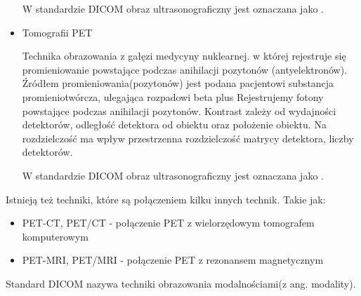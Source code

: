 \begin{itemize}
    W standardzie DICOM obraz ultrasonograficzny jest oznaczana jako .

    \item Tomografii PET
    
    Technika obrazowania  z gałęzi medycyny nuklearnej. w której rejestruje się promieniowanie powstające podczas anihilacji pozytonów (antyelektronów).
    Źródłem promieniowania(pozytonów) jest podana pacjentowi substancja promieniotwórcza, ulegająca rozpadowi beta plus
    Rejestrujemy fotony powstające podczas anihilacji pozytonów.
    Kontrast zależy od wydajności detektorów, odległość detektora od obiektu oraz położenie obiektu.
    Na rozdzielczość ma wpływ przestrzenna rozdzielczość matrycy detektora, liczby detektorów.

    W standardzie DICOM obraz ultrasonograficzny jest oznaczana jako .
    
\end{itemize}

Istnieją też techniki, które są połączeniem kilku innych technik.
Takie jak:
\begin{itemize}
    \item PET-CT, PET/CT - połączenie PET z wielorzędowym tomografem komputerowym
    \item PET-MRI, PET/MRI - połączenie PET z rezonansem magnetycznym
\end{itemize}

Standard DICOM nazywa techniki obrazowania modalnościami(z ang. modality).